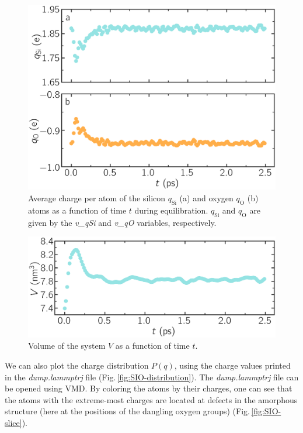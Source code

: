\documentclass[9pt,tutorial]{livecoms}
\begin{document}
\begin{figure}
\centering
\includegraphics[width=\linewidth]{SIO-charge}
\caption{Average charge per atom of the silicon $q_\text{Si}$ (a) and oxygen
$q_\text{O}$ (b) atoms as a function of time $t$ during equilibration.  $q_\text{Si}$
and $q_\text{O}$ are given by the \textit{v\_qSi} and \textit{v\_qO} variables,
respectively.}
\label{fig:SIO-charge}
\end{figure}

\begin{figure}
\includegraphics[width=\linewidth]{SIO-volume}
\caption{Volume of the system $V$ as a function of time $t$.}
\label{fig:SIO-volume}
\end{figure}

We can also plot the charge distribution $P(q)$, using the charge values
printed in the \textit{dump.lammptrj} file (Fig.\,\ref{fig:SIO-distribution}).
The \textit{dump.lammptrj} file can be opened using VMD. By coloring the atoms
by their charges, one can see that the atoms with the extreme-most charges are
located at defects in the amorphous structure (here at the positions of the
dangling oxygen groups) (Fig.\,\ref{fig:SIO-slice}).
\end{document}
